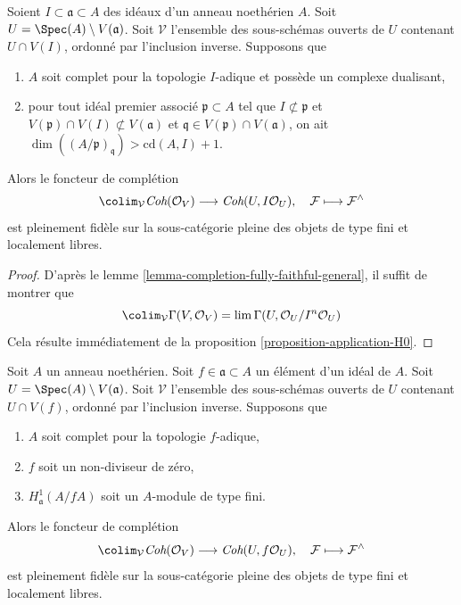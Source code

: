 \begin{lemma}
\label{lemma-fully-faithful-general}
Soient $I \subset \mathfrak a \subset A$ des idéaux d'un anneau noethérien $A$.
Soit $U = \Spec(A) \setminus V(\mathfrak a)$. Soit $\mathcal{V}$
l'ensemble des sous-schémas ouverts de $U$ contenant $U \cap V(I)$,
ordonné par l'inclusion inverse. Supposons que
\begin{enumerate}
\item $A$ soit complet pour la topologie $I$-adique et possède un complexe dualisant,
\item pour tout idéal premier associé
$\mathfrak p \subset A$ tel que
$I \not \subset \mathfrak p$ et
$V(\mathfrak p) \cap V(I) \not \subset V(\mathfrak a)$
et $\mathfrak q \in V(\mathfrak p) \cap V(\mathfrak a)$, on ait
$\dim((A/\mathfrak p)_\mathfrak q) > \text{cd}(A, I) + 1$.
\end{enumerate}
Alors le foncteur de complétion
$$
\colim_\mathcal{V} \textit{Coh}(\mathcal{O}_V)
\longrightarrow
\textit{Coh}(U, I\mathcal{O}_U),
\quad
\mathcal{F} \longmapsto \mathcal{F}^\wedge
$$
est pleinement fidèle sur la sous-catégorie pleine des
objets de type fini et localement libres.
\end{lemma}

\begin{proof}
D'après le lemme \ref{lemma-completion-fully-faithful-general},
il suffit de montrer que
$$
\colim_\mathcal{V} \Gamma(V, \mathcal{O}_V) =
\lim \Gamma(U, \mathcal{O}_U/I^n\mathcal{O}_U)
$$
Cela résulte immédiatement de la proposition \ref{proposition-application-H0}.
\end{proof}

\begin{lemma}
\label{lemma-fully-faithful-general-alternative}
Soit $A$ un anneau noethérien. Soit $f \in \mathfrak a \subset A$
un élément d'un idéal de $A$. Soit $U = \Spec(A) \setminus V(\mathfrak a)$.
Soit $\mathcal{V}$ l'ensemble des sous-schémas ouverts de $U$ contenant $U \cap V(f)$,
ordonné par l'inclusion inverse. Supposons que
\begin{enumerate}
\item $A$ soit complet pour la topologie $f$-adique,
\item $f$ soit un non-diviseur de zéro,
\item $H^1_\mathfrak a(A/fA)$ soit un $A$-module de type fini.
\end{enumerate}
Alors le foncteur de complétion
$$
\colim_\mathcal{V} \textit{Coh}(\mathcal{O}_V)
\longrightarrow
\textit{Coh}(U, f\mathcal{O}_U),
\quad
\mathcal{F} \longmapsto \mathcal{F}^\wedge
$$
est pleinement fidèle sur la sous-catégorie pleine des objets de type fini et localement libres.
\end{lemma}


